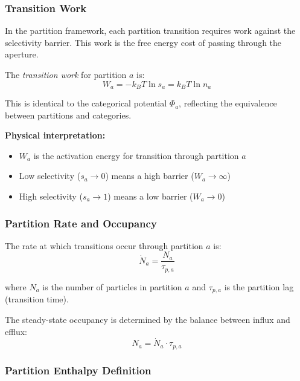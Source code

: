 \subsubsection{Transition Work}

In the partition framework, each partition transition requires work against the selectivity barrier. This work is the free energy cost of passing through the aperture.

\begin{definition}
The \textit{transition work} for partition $a$ is:
\begin{equation}
W_a = -k_B T \ln s_a = k_B T \ln n_a
\end{equation}
\end{definition}

This is identical to the categorical potential $\Phi_a$, reflecting the equivalence between partitions and categories.

\textbf{Physical interpretation:}
\begin{itemize}
\item $W_a$ is the activation energy for transition through partition $a$
\item Low selectivity ($s_a \to 0$) means a high barrier ($W_a \to \infty$)
\item High selectivity ($s_a \to 1$) means a low barrier ($W_a \to 0$)
\end{itemize}

\subsubsection{Partition Rate and Occupancy}

The rate at which transitions occur through partition $a$ is:
\begin{equation}
\dot{N}_a = \frac{N_a}{\tau_{p,a}}
\end{equation}

where $N_a$ is the number of particles in partition $a$ and $\tau_{p,a}$ is the partition lag (transition time).

The steady-state occupancy is determined by the balance between influx and efflux:
\begin{equation}
N_a = \dot{N}_a \cdot \tau_{p,a}
\end{equation}

\subsubsection{Partition Enthalpy Definition}

